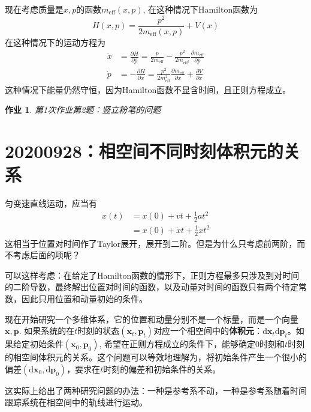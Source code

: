 \documentclass[12pt]{article}
\newtheorem{asg}{作业}
\begin{document}
    现在考虑质量是$x,p$的函数$m_\mathrm{eff}(x,p)$, 在这种情况下Hamilton函数为
    \begin{equation}
        H(x,p) = \frac {p^2}{2m_\mathrm{eff}(x,p)} + V(x)
    \end{equation}
    在这种情况下的运动方程为
    \begin{equation}\begin{aligned}
        \dot{x} &= \frac {\partial H}{\partial p} = \frac {p}{2m_{\mathrm{eff}}} - \frac {p^2}{2m_{\mathrm{eff}^2}} \frac {\partial m_\mathrm{eff}}{\partial p} \\
        \dot{p} &= -\frac {\partial H}{\partial x} = \frac {p^2}{2m_\mathrm{eff}^2} \frac {\partial m_\mathrm{eff}}{\partial x} + \frac {\partial V}{\partial x}
    \end{aligned}\end{equation}
    这种情况下能量仍然守恒，因为Hamilton函数不显含时间，且正则方程成立。
    \begin{asg}
        第1次作业第2题：竖立粉笔的问题
    \end{asg}

\section{20200928：相空间不同时刻体积元的关系}
    匀变速直线运动，应当有
    \begin{equation}\begin{aligned}
        x(t) &= x(0) + vt + \frac 12 at^2\\
        &= x(0) + \dot{x}t + \frac 12 \ddot{x}t^2
    \end{aligned}\end{equation}
    这相当于位置对时间作了Taylor展开，展开到二阶。但是为什么只考虑前两阶，而不考虑后面的项呢？

    可以这样考虑：在给定了Hamilton函数的情形下，正则方程最多只涉及到对时间的二阶导数，最终解出位置对时间的函数，以及动量对时间的函数只有两个待定常数，因此只用位置和动量初始的条件。

    现在开始研究一个多维体系，它的位置和动量分别不是一个标量，而是一个向量$\bm{x}, \bm{p}$. 如果系统的在$t$时刻的状态$(\bm{x}_t,\bm{p}_t)$对应一个相空间中的\textbf{体积元}：$\mathrm{d}\bm{x}_t\mathrm{d}\bm{p}_t$。如果给定初始条件$(\bm{x}_0,\bm{p}_0)$, 希望在正则方程成立的条件下，能够确定0时刻和$t$时刻的相空间体积元的关系。这个问题可以等效地理解为，将初始条件产生一个很小的偏差$(\mathrm{d}\bm{x}_0,\mathrm{d}\bm{p}_0)$，要求在$t$时刻的偏差和初始条件的关系。

    这实际上给出了两种研究问题的办法：一种是参考系不动，一种是参考系随着时间跟踪系统在相空间中的轨线进行运动。
\end{document}
